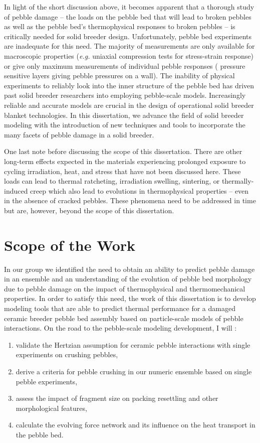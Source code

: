 In light of the short discussion above, it becomes apparent that a thorough study of pebble damage -- the loads on the pebble bed that will lead to broken pebbles as well as the pebble bed's thermophysical responses to broken pebbles -- is critically needed for solid breeder design. Unfortunately, pebble bed experiments are inadequate for this need. The majority of measurements are only available for macroscopic properties (\textit{e.g.} uniaxial compression tests for stress-strain response) or give only maximum measurements of individual pebble responses ( pressure sensitive layers giving pebble pressures on a wall). The inability of physical experiments to reliably look into the inner structure of the pebble bed has driven past solid breeder researchers into employing pebble-scale models. Increasingly reliable and accurate models are crucial in the design of operational solid breeder blanket technologies. In this dissertation, we advance the field of solid breeder modeling with the introduction of new techniques and tools to incorporate the many facets of pebble damage in a solid breeder.

One last note before discussing the scope of this dissertation. There are other long-term effects expected in the materials experiencing prolonged exposure to cycling irradiation, heat, and stress that have not been discussed here. These loads can lead to thermal ratcheting, irradiation swelling, sintering, or thermally-induced creep which also lead to evolutions in thermophysical properties -- even in the absence of cracked pebbles. These phenomena need to be addressed in time but are, however, beyond the scope of this dissertation. 

 

\section{Scope of the Work}\label{sec:intro-scope-of-work}

In our group we identified the need to obtain an ability to predict pebble damage in an ensemble and an understanding of the evolution of pebble bed morphology due to pebble damage on the impact of thermophysical and thermomechanical properties. In order to satisfy this need, the work of this dissertation is to develop modeling tools that are able to predict thermal performance for a damaged ceramic breeder pebble bed assembly based on particle-scale models of pebble interactions. On the road to the pebble-scale modeling development, I will :
\begin{enumerate}
\item validate the Hertzian assumption for ceramic pebble interactions with single experiments on crushing pebbles,
\item derive a criteria for pebble crushing in our numeric ensemble based on single pebble experiments,
\item assess the impact of fragment size on packing resettling and other morphological features,
\item calculate the evolving force network and its influence on the heat transport in the pebble bed.
\end{enumerate}

